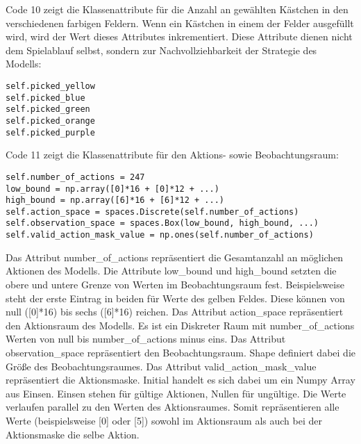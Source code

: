 \begin{minipage}{\linewidth}
Code 10 zeigt die Klassenattribute für die Anzahl an gewählten Kästchen in den verschiedenen farbigen Feldern. Wenn ein Kästchen in einem der Felder ausgefüllt wird, wird der Wert dieses Attributes inkrementiert. Diese Attribute dienen nicht dem Spielablauf selbst, sondern zur Nachvollziehbarkeit der Strategie des Modells:
\vspace{0.5cm}
\begin{lstlisting}[caption={Klassenattribute für die Anzahl an gewählte Kästchen innerhalb der farbigen Feldern}, basicstyle=\ttfamily]
self.picked_yellow
self.picked_blue
self.picked_green
self.picked_orange
self.picked_purple
\end{lstlisting}
\end{minipage}

\begin{minipage}{\linewidth}
Code 11 zeigt die Klassenattribute für den Aktions- sowie Beobachtungsraum:
\vspace{0.5cm}
\begin{lstlisting}[caption={Klassenattribute des Aktions- und Beobachtungsraumes}, basicstyle=\ttfamily]
self.number_of_actions = 247
low_bound = np.array([0]*16 + [0]*12 + ...)
high_bound = np.array([6]*16 + [6]*12 + ...)
self.action_space = spaces.Discrete(self.number_of_actions)
self.observation_space = spaces.Box(low_bound, high_bound, ...)
self.valid_action_mask_value = np.ones(self.number_of_actions)
\end{lstlisting}
\end{minipage}

Das Attribut number\_of\_actions repräsentiert die Gesamtanzahl an möglichen Aktionen des Modells. Die Attribute low\_bound und high\_bound setzten die obere und untere Grenze von Werten im Beobachtungsraum fest. Beispielsweise steht der erste Eintrag in beiden für Werte des gelben Feldes. Diese können von null ([0]*16) bis sechs ([6]*16) reichen. Das Attribut action\_space repräsentiert den Aktionsraum des Modells. Es ist ein Diskreter Raum mit number\_of\_actions Werten von null bis number\_of\_actions minus eins. Das Attribut observation\_space repräsentiert den Beobachtungsraum. Shape definiert dabei die Größe des Beobachtungsraumes. Das Attribut valid\_action\_mask\_value repräsentiert die Aktionsmaske. Initial handelt es sich dabei um ein Numpy Array aus Einsen. Einsen stehen für gültige Aktionen, Nullen für ungültige. Die Werte verlaufen parallel zu den Werten des Aktionsraumes. Somit repräsentieren alle Werte (beispielsweise [0] oder [5]) sowohl im Aktionsraum als auch bei der Aktionsmaske die selbe Aktion.\\

